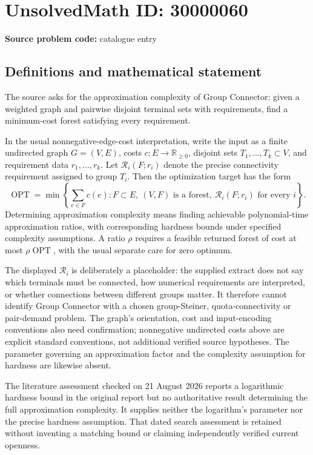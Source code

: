 \documentclass[11pt]{article}
\newcommand{\R}{\mathbb{R}}
\begin{document}
\section*{UnsolvedMath ID: 30000060}
\textbf{Source problem code:} catalogue entry
\subsection{Definitions and mathematical statement}
The source asks for the approximation complexity of Group Connector: given a weighted graph and pairwise disjoint terminal sets with requirements, find a minimum-cost forest satisfying every requirement.

In the usual nonnegative-edge-cost interpretation, write the input as a finite undirected graph $G=(V,E)$, costs $c:E\to\R_{\ge0}$, disjoint sets $T_1,\ldots,T_k\subset V$, and requirement data $r_1,\ldots,r_k$. Let $\mathcal R_i(F;r_i)$ denote the precise connectivity requirement assigned to group $T_i$. Then the optimization target has the form
\[
 \operatorname{OPT}=\min\left\{\sum_{e\in F}c(e):
 F\subset E,\ (V,F)\text{ is a forest},\ 
 \mathcal R_i(F;r_i)\text{ for every }i\right\}.
\]
Determining approximation complexity means finding achievable polynomial-time approximation ratios, with corresponding hardness bounds under specified complexity assumptions. A ratio $\rho$ requires a feasible returned forest of cost at most $\rho\operatorname{OPT}$, with the usual separate care for zero optimum.

The displayed $\mathcal R_i$ is deliberately a placeholder: the supplied extract does not say which terminals must be connected, how numerical requirements are interpreted, or whether connections between different groups matter. It therefore cannot identify Group Connector with a chosen group-Steiner, quota-connectivity or pair-demand problem. The graph's orientation, cost and input-encoding conventions also need confirmation; nonnegative undirected costs above are explicit standard conventions, not additional verified source hypotheses. The parameter governing an approximation factor and the complexity assumption for hardness are likewise absent.

The literature assessment checked on 21 August 2026 reports a logarithmic hardness bound in the original report but no authoritative result determining the full approximation complexity. It supplies neither the logarithm's parameter nor the precise hardness assumption. That dated search assessment is retained without inventing a matching bound or claiming independently verified current openness.
\end{document}

